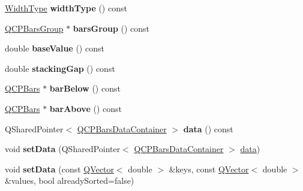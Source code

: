 \begin{DoxyCompactItemize}
\item 
\hyperlink{class_q_c_p_bars_a65dbbf1ab41cbe993d71521096ed4649}{Width\+Type} {\bfseries width\+Type} () const \hypertarget{class_q_c_p_bars_a8606651ada5804075f6affd04c88dd05}{}\label{class_q_c_p_bars_a8606651ada5804075f6affd04c88dd05}

\item 
\hyperlink{class_q_c_p_bars_group}{Q\+C\+P\+Bars\+Group} $\ast$ {\bfseries bars\+Group} () const \hypertarget{class_q_c_p_bars_a6d6b2b17619a0ba9c7a88bb2b90fc178}{}\label{class_q_c_p_bars_a6d6b2b17619a0ba9c7a88bb2b90fc178}

\item 
double {\bfseries base\+Value} () const \hypertarget{class_q_c_p_bars_a3c8686a74396883fd1da87b2e325b043}{}\label{class_q_c_p_bars_a3c8686a74396883fd1da87b2e325b043}

\item 
double {\bfseries stacking\+Gap} () const \hypertarget{class_q_c_p_bars_af2cdffc1a2adb784ec06a986691750cb}{}\label{class_q_c_p_bars_af2cdffc1a2adb784ec06a986691750cb}

\item 
\hyperlink{class_q_c_p_bars}{Q\+C\+P\+Bars} $\ast$ {\bfseries bar\+Below} () const \hypertarget{class_q_c_p_bars_a45c16879198ef5a2441838762828ddc3}{}\label{class_q_c_p_bars_a45c16879198ef5a2441838762828ddc3}

\item 
\hyperlink{class_q_c_p_bars}{Q\+C\+P\+Bars} $\ast$ {\bfseries bar\+Above} () const \hypertarget{class_q_c_p_bars_a08042270d1fa7babcb39a63587d12487}{}\label{class_q_c_p_bars_a08042270d1fa7babcb39a63587d12487}

\item 
Q\+Shared\+Pointer$<$ \hyperlink{class_q_c_p_data_container}{Q\+C\+P\+Bars\+Data\+Container} $>$ {\bfseries data} () const \hypertarget{class_q_c_p_bars_aed933b03f4fde80c73b0c5df5bb68133}{}\label{class_q_c_p_bars_aed933b03f4fde80c73b0c5df5bb68133}

\item 
void {\bfseries set\+Data} (Q\+Shared\+Pointer$<$ \hyperlink{class_q_c_p_data_container}{Q\+C\+P\+Bars\+Data\+Container} $>$ \hyperlink{class_q_c_p_bars_afa75a82bb667d0300da551b47771ac5f}{data})\hypertarget{class_q_c_p_bars_a6dc562ec7120a8521e1061f2134367e4}{}\label{class_q_c_p_bars_a6dc562ec7120a8521e1061f2134367e4}

\item 
void {\bfseries set\+Data} (const \hyperlink{class_q_vector}{Q\+Vector}$<$ double $>$ \&keys, const \hyperlink{class_q_vector}{Q\+Vector}$<$ double $>$ \&values, bool already\+Sorted=false)\hypertarget{class_q_c_p_bars_a2a88cd5b16ec7b71e5a590f95b50c5ce}{}\label{class_q_c_p_bars_a2a88cd5b16ec7b71e5a590f95b50c5ce}


\end{DoxyCompactItemize}
